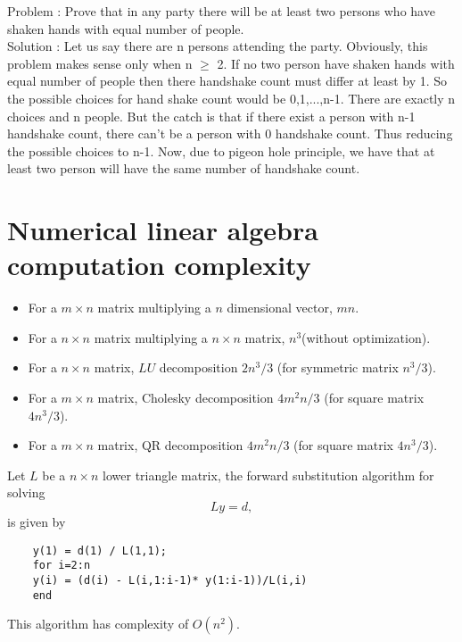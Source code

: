 \begin{refsection}
\begin{example}
Problem : Prove that in any party there will be at least two persons who have shaken hands with equal number of people.\\

Solution : Let us say there are n persons attending the party. Obviously, this problem makes sense only when n $\geq$ 2. If no two person have shaken hands with equal number of people then there handshake count must differ at least by 1. So the possible choices for hand shake count would be 0,1,...,n-1. There are exactly n choices and n people. But the catch is that if there exist a person with n-1 handshake count, there can't be a person with 0 handshake count. Thus reducing the possible choices to n-1. Now, due to pigeon hole principle, we have that at least two person will have the same number of handshake count.
\end{example}

\section{Numerical linear algebra computation complexity}

\begin{note}\cite[606]{nocedal2006numerical}
	\begin{itemize}
		\item For a $m\times n$ matrix multiplying a $n$ dimensional vector, $mn$.
		\item For a $n\times n$ matrix multiplying a $n\times n$ matrix, $n^3$(without optimization).
		\item For a $n\times n$ matrix, $LU$ decomposition $2n^3/3$ (for symmetric matrix $n^3/3$).
		\item For a $m\times n$ matrix, Cholesky decomposition $4m^2n/3$ (for square matrix $4n^3/3$).
		\item For a $m\times n$ matrix, QR decomposition $4m^2n/3$ (for square matrix $4n^3/3$).
	\end{itemize}	
\end{note}


\begin{note}
	Let $L$ be a $n\times n$ lower triangle matrix, the forward substitution algorithm for solving
	$$Ly = d,$$
	is given by
	\begin{verbatim}
	y(1) = d(1) / L(1,1);
	for i=2:n
	y(i) = (d(i) - L(i,1:i-1)* y(1:i-1))/L(i,i)
	end
	\end{verbatim}
	This algorithm has complexity of $O(n^2)$.
	

\end{note}
\end{refsection}
